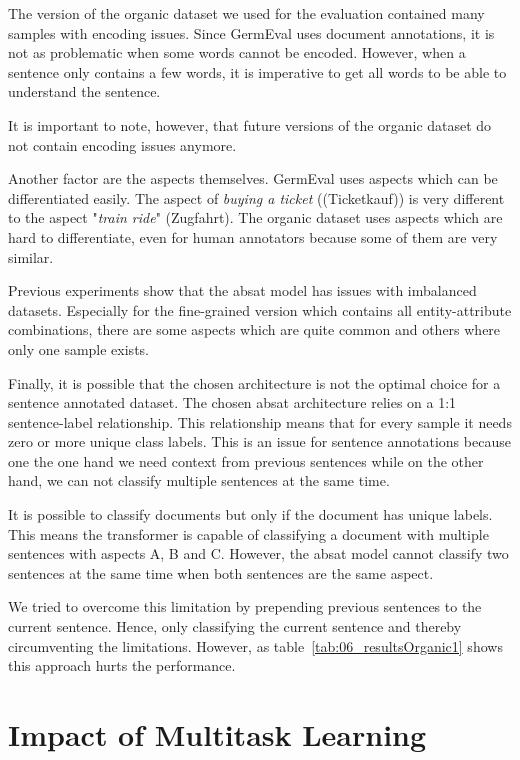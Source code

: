 The version of the organic dataset we used for the evaluation contained many samples with encoding issues. Since GermEval uses document annotations, it is not as problematic when some words cannot be encoded. However, when a sentence only contains a few words, it is imperative to get all words to be able to understand the sentence. 

It is important to note, however, that future versions of the organic dataset do not contain encoding issues anymore.
\medskip

Another factor are the aspects themselves. GermEval uses aspects which can be differentiated easily. The aspect of \textit{buying a ticket} {((Ticketkauf))} is very different to the aspect "\textit{train ride}" {(Zugfahrt)}. The organic dataset uses aspects which are hard to differentiate, even for human annotators because some of them are very similar.
\medskip

Previous experiments show that the \gls{absat} model has issues with imbalanced datasets. Especially for the fine-grained version which contains all entity-attribute combinations, there are some aspects which are quite common and others where only one sample exists.
\medskip

Finally, it is possible that the chosen architecture is not the optimal choice for a sentence annotated dataset. The chosen \gls{absat} architecture relies on a 1:1 sentence-label relationship. This relationship means that for every sample it needs zero or more unique class labels. This is an issue for sentence annotations because one the one hand we need context from previous sentences while on the other hand, we can not classify multiple sentences at the same time.
\smallskip

It is possible to classify documents but only if the document has unique labels. This means the transformer is capable of classifying a document with multiple sentences with aspects A, B and C. However, the \gls{absat} model cannot classify two sentences at the same time when both sentences are the same aspect.
\medskip

We tried to overcome this limitation by prepending previous sentences to the current sentence. Hence, only classifying the current sentence and thereby circumventing the limitations. However, as table~\ref{tab:06_resultsOrganic1} shows this approach hurts the performance.
\section{Impact of Multitask Learning}
\label{sec:06_ResultsMultitask}

